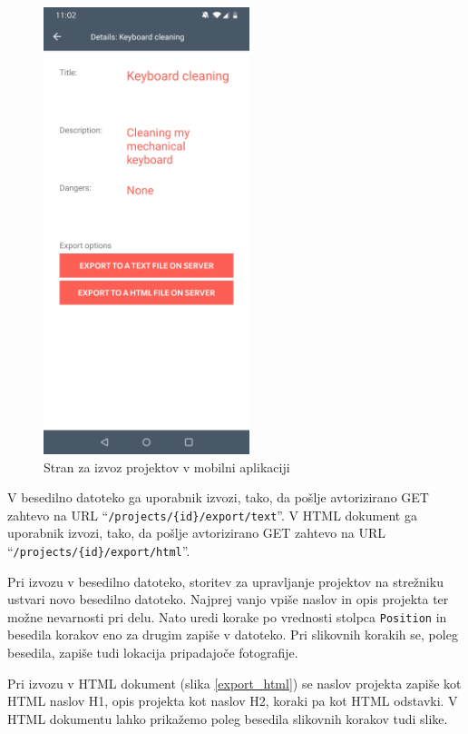 \documentclass[a4paper, 12pt]{book}
\begin{document}
\begin{figure}[H]
\begin{center}
	\includegraphics[width=6cm]{app_project_export}
\end{center}
	\caption{Stran za izvoz projektov v mobilni aplikaciji}
\label{app_project_export}
\end{figure}

V besedilno datoteko ga uporabnik izvozi, tako, da pošlje avtorizirano GET zahtevo na URL \enquote{\texttt{/projects/\{id\}/export/text}}.
V HTML dokument ga uporabnik izvozi, tako, da pošlje avtorizirano GET zahtevo na URL \enquote{\texttt{/projects/\{id\}/export/html}}.

Pri izvozu v besedilno datoteko, storitev za upravljanje projektov na strežniku ustvari novo besedilno datoteko.
Najprej vanjo vpiše naslov in opis projekta ter možne nevarnosti pri delu.
Nato uredi korake po vrednosti stolpca \texttt{Position} in besedila korakov eno za drugim zapiše v datoteko.
Pri slikovnih korakih se, poleg besedila, zapiše tudi lokacija pripadajoče fotografije.

Pri izvozu v HTML dokument (slika \ref{export_html}) se naslov projekta zapiše kot HTML naslov H1, opis projekta kot naslov H2, koraki pa kot HTML odstavki.
V HTML dokumentu lahko prikažemo poleg besedila slikovnih korakov tudi slike.
\end{document}

